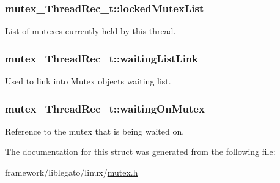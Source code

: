 \subsubsection[{\texorpdfstring{locked\+Mutex\+List}{lockedMutexList}}]{ mutex\+\_\+\+Thread\+Rec\+\_\+t\+::locked\+Mutex\+List}\hypertarget{structmutex___thread_rec__t_aaf177668057eb3a75e26c2175e5590c5}{}\label{structmutex___thread_rec__t_aaf177668057eb3a75e26c2175e5590c5}


List of mutexes currently held by this thread. 

\subsubsection[{\texorpdfstring{waiting\+List\+Link}{waitingListLink}}]{ mutex\+\_\+\+Thread\+Rec\+\_\+t\+::waiting\+List\+Link}\hypertarget{structmutex___thread_rec__t_a2e4c4ef6832e484e25f4802fc4bba33b}{}\label{structmutex___thread_rec__t_a2e4c4ef6832e484e25f4802fc4bba33b}


Used to link into Mutex object\textquotesingle{}s waiting list. 

\subsubsection[{\texorpdfstring{waiting\+On\+Mutex}{waitingOnMutex}}]{ mutex\+\_\+\+Thread\+Rec\+\_\+t\+::waiting\+On\+Mutex}\hypertarget{structmutex___thread_rec__t_ad24966766d75804e6c3dc38bba4e6c99}{}\label{structmutex___thread_rec__t_ad24966766d75804e6c3dc38bba4e6c99}


Reference to the mutex that is being waited on. 



The documentation for this struct was generated from the following file\+:\begin{DoxyCompactItemize}
\item 
framework/liblegato/linux/\hyperlink{mutex_8h}{mutex.\+h}\end{DoxyCompactItemize}
